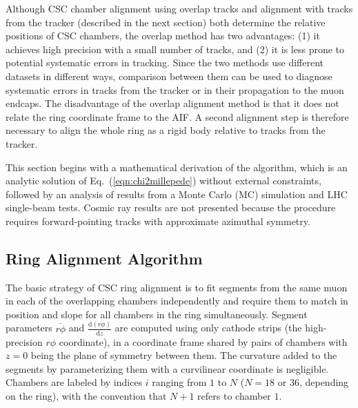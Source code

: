 Although CSC chamber alignment using overlap tracks and alignment with tracks from the tracker (described
in the next section) both determine the relative positions of CSC
chambers, the overlap method has two advantages: (1) it achieves high
precision with a small number of tracks, and (2) it is less prone to
potential systematic errors in tracking.  Since the two methods use
different datasets in different ways, comparison between them can be
used to diagnose systematic errors in tracks from the tracker or in their propagation
to the muon endcaps.  The disadvantage of the overlap alignment method
is that it does not relate the ring coordinate frame to the AIF.  A
second alignment step is therefore necessary to align the whole ring
as a rigid body relative to tracks from the tracker.

This section begins with a mathematical derivation of the algorithm,
which is an analytic solution of Eq.~(\ref{eqn:chi2millepede}) without
external constraints, followed by an analysis of results from a Monte
Carlo (MC) simulation and LHC single-beam tests.  Cosmic ray results
are not presented because the procedure requires forward-pointing
tracks with approximate azimuthal symmetry.

\subsection{Ring Alignment Algorithm}

The basic strategy of CSC ring alignment is to fit 
segments from the same muon in each of the overlapping chambers
independently and require them to match in position and slope for all
chambers in the ring simultaneously.  Segment parameters
$\overline{r\phi}$ and $\frac{\textrm{d}(r\phi)}{\textrm{d}z}$ are computed using only
cathode strips (the high-precision $r\phi$ coordinate), in a
coordinate frame shared by pairs of chambers with $z=0$ being the
plane of symmetry between them.  The curvature added to the segments
by parameterizing them with a curvilinear coordinate is negligible.
Chambers are labeled by indices $i$ ranging from $1$ to $N$ ($N=18$ or
$36$, depending on the ring), with the convention that $N+1$ refers to
chamber $1$.

